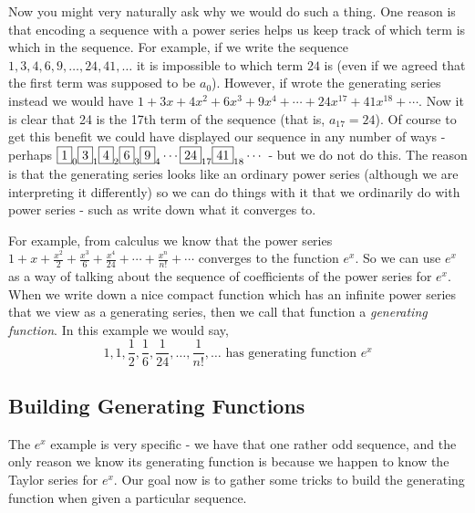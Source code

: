 \documentclass[12pt]{article}
\begin{document}
Now you might very naturally ask why we would do such a thing.  One reason is that encoding a sequence with a power series helps us keep track of which term is which in the sequence.  For example, if we write the sequence $1, 3, 4, 6, 9, \ldots, 24, 41,\ldots$ it is impossible to which term $24$ is (even if we agreed that the first term was supposed to be $a_0$).  However, if wrote the generating series instead we would have $1 + 3x + 4x^2 + 6x^3 + 9x^4 + \cdots + 24 x^{17} + 41 x^{18} + \cdots$.  Now it is clear that 24 is the 17th term of the sequence (that is, $a_{17} = 24$).  Of course to get this benefit we could have displayed our sequence in any number of ways - perhaps $\fbox{1}_0 \fbox{3}_1 \fbox{4}_2 \fbox{6}_3 \fbox{9}_4 \cdots \fbox{24}_{17}\fbox{41}_{18}\cdots$ - but we do not do this. The reason is that the generating series looks like an ordinary power series (although we are interpreting it differently) so we can do things with it that we ordinarily do with power series - such as write down what it converges to.

For example, from calculus we know that the power series $1 + x + \frac{x^2}{2} + \frac{x^3}{6} + \frac{x^4}{24} + \cdots + \frac{x^n}{n!} + \cdots$ converges to the function $e^x$.  So we can use $e^x$ as a way of talking about the sequence of coefficients of the power series for $e^x$.  When we write down a nice compact function which has an infinite power series that we view as a generating series, then we call that function a {\em generating function}.  In this example we would say,
\[1, 1, \frac{1}{2}, \frac{1}{6}, \frac{1}{24}, \ldots, \frac{1}{n!}, \ldots \mbox{ has generating function } e^x\]

\subsection{Building Generating Functions}

The $e^x$ example is very specific - we have that one rather odd sequence, and the only reason we know its generating function is because we happen to know the Taylor series for $e^x$.  Our goal now is to gather some tricks to build the generating function when given a particular sequence.
 
\end{document}

